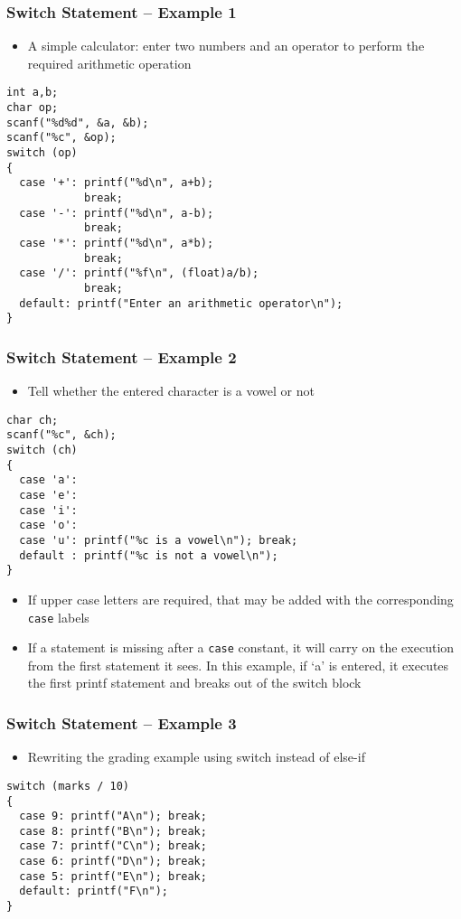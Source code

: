 \documentclass[11pt]{beamer}
\begin{document}
\begin{frame}[fragile]\frametitle{Switch Statement -- Example 1}
\label{sec-1-9}

\begin{itemize}
\item A simple calculator: enter two numbers and an operator to perform the required arithmetic operation
\end{itemize}

\begin{verbatim}
int a,b;
char op;
scanf("%d%d", &a, &b);
scanf("%c", &op);
switch (op)
{
  case '+': printf("%d\n", a+b);
            break;
  case '-': printf("%d\n", a-b);
            break;
  case '*': printf("%d\n", a*b);
            break;
  case '/': printf("%f\n", (float)a/b);
            break;
  default: printf("Enter an arithmetic operator\n");
}
\end{verbatim}
\end{frame}
\begin{frame}[fragile]\frametitle{Switch Statement -- Example 2}
\label{sec-1-10}

\begin{itemize}
\item Tell whether the entered character is a vowel or not
\end{itemize}

\begin{verbatim}
char ch;
scanf("%c", &ch);
switch (ch)
{
  case 'a':
  case 'e':
  case 'i':
  case 'o':
  case 'u': printf("%c is a vowel\n"); break;
  default : printf("%c is not a vowel\n");
}
\end{verbatim}
\begin{itemize}
\item If upper case letters are required, that may be added with the corresponding \verb~case~ labels
\item If a statement is missing after a \verb~case~ constant, it will carry on the execution from the first statement it sees. In this example, if `a' is entered, it executes the first printf statement and breaks out of the switch block
\end{itemize}
\end{frame}
\begin{frame}[fragile]\frametitle{Switch Statement -- Example 3}
\label{sec-1-11}

\begin{itemize}
\item Rewriting the grading example using switch instead of else-if
\end{itemize}

\begin{verbatim}
switch (marks / 10)
{
  case 9: printf("A\n"); break;
  case 8: printf("B\n"); break;
  case 7: printf("C\n"); break;
  case 6: printf("D\n"); break;
  case 5: printf("E\n"); break;
  default: printf("F\n");
}
\end{verbatim}
\end{frame}
\end{document}
